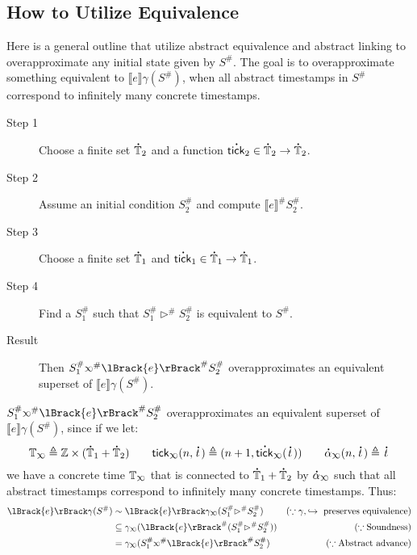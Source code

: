 \documentclass[acmsmall,screen,review]{acmart}\settopmatter{printfolios=true,printccs=false,printacmref=false}
\theoremstyle{acmdefinition}
\newcommand*{\A}[1]{\overset{\,_{\mbox{\Large .}}}{#1}}
\newcommand*{\Abs}[1]{{#1}^{\#}}
\newcommand*{\Time}{\mathbb{T}}
\newcommand*{\ATime}{\A{\Time}}
\newcommand*{\semarrow}{\hookrightarrow}
\newcommand*{\semlink}{\mathbin{\rotatebox[origin=c]{180}{$\propto$}}}
\newcommand*{\equivalent}{\sim}
\newcommand*{\sembracket}[1]{\lBrack{#1}\rBrack}
\newcommand*{\tick}{\mathsf{tick}}
\begin{document}
\subsection{How to Utilize Equivalence}
Here is a general outline that utilize abstract equivalence and abstract linking to overapproximate any initial state given by $\Abs{S}$.
The goal is to overapproximate something equivalent to $\sembracket{e}\gamma(\Abs{S})$, when all abstract timestamps in $\Abs{S}$ correspond to infinitely many concrete timestamps.
\begin{description}
  \item[Step 1] Choose a finite set $\A\Time_2$ and a function $\A\tick_2\in\A\Time_2\rightarrow\A\Time_2$.
  \item[Step 2] Assume an initial condition $\Abs{S}_2$ and compute $\Abs{\sembracket{e}}\Abs{S}_2$.
  \item[Step 3] Choose a finite set $\A\Time_1$ and $\A\tick_1\in\A\Time_1\rightarrow\A\Time_1$.
  \item[Step 4] Find a $\Abs{S}_1$ such that $\Abs{S}_1\Abs\rhd\Abs{S}_2$ is equivalent to $\Abs{S}$.
  \item[Result] Then $\Abs{S}_1\Abs\semlink\Abs{\sembracket{e}}\Abs{S}_2$ overapproximates an equivalent superset of $\sembracket{e}\gamma(\Abs{S})$.
\end{description}
$\Abs{S}_1\Abs\semlink\Abs{\sembracket{e}}\Abs{S}_2$ overapproximates an equivalent superset of $\sembracket{e}\gamma(\Abs{S})$, since if we let:
\[\Time_{\semlink}\triangleq\mathbb{Z}\times(\ATime_1+\ATime_2)\qquad\tick_{\semlink}(n,\A{t})\triangleq(n+1,\A\tick_{\semlink}(\A{t}))\qquad\A\alpha_{\semlink}(n,\A{t})\triangleq\A{t}\]
we have a concrete time $\Time_{\semlink}$ that is connected to $\ATime_1+\ATime_2$ by $\A\alpha_{\semlink}$ such that all abstract timestamps correspond to infinitely many concrete timestamps.
Thus:
\begin{align*}
  \sembracket{e}\gamma(\Abs{S}) & \equivalent\sembracket{e}\gamma_{\semlink}(\Abs{S}_1\Abs\rhd\Abs{S}_2)       & (\because\gamma,\semarrow\text{ preserves equivalence})                      \\
                                & \subseteq\gamma_{\semlink}(\Abs{\sembracket{e}}(\Abs{S}_1\Abs\rhd\Abs{S}_2)) & (\because\text{Soundness})                                                   \\
                                & =\gamma_{\semlink}(\Abs{S}_1\Abs\semlink\Abs{\sembracket{e}}\Abs{S}_2)       & (\because\text{Abstract advance})
\end{align*}
\end{document}
